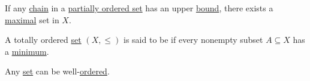 \begin{Lemma}\label{thm:zorns_lemma}\cite{nLab:zorns_lemma}
  If any \hyperref[def:poset_chain]{chain} in a \hyperref[def:poset]{partially ordered set} has an upper \hyperref[def:preordered_set/upper_lower_bound]{bound}, there exists a \hyperref[def:preordered_set/maximal_minimal_element]{maximal} set in \( X \).
\end{Lemma}

\begin{Definition}\label{def:well_ordered_set}
  A totally ordered \hyperref[def:totally_ordered_set]{set} \( (X, \leq) \) is said to be  if every nonempty subset \( A \subseteq X \) has a \hyperref[def:preordered_set/largest_smallest_element]{minimum}.
\end{Definition}

\begin{Theorem}\label{thm:well_ordering_principle}\cite[196]{Enderton1977}
  Any \hyperref[def:set_zfc]{set} can be well-\hyperref[def:well_ordered_set]{ordered}.
\end{Theorem}
